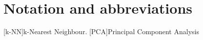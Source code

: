 \section{Notation and abbreviations}
\begin{acronym}[AWGN]
[k-NN]{k-Nearest Neighbour.}
[PCA]{Principal Component Analysis}
\end{acronym}